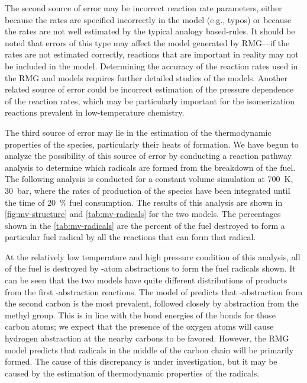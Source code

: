 \documentclass[12pt]{../ussci}
\begin{document}
The second source of error may be incorrect reaction rate parameters, either
because the rates are specified incorrectly in the model (e.g., typos) or
because the rates are not well estimated by the typical analogy based-rules. It
should be noted that errors of this type may affect the model generated by
RMG---if the rates are not estimated correctly, reactions that are important in
reality may not be included in the model. Determining the accuracy of the
reaction rates used in the RMG and \textcite{Dievart2013} models requires
further detailed studies of the models. Another related source of error could be
incorrect estimation of the pressure dependence of the reaction rates, which may
be particularly important for the isomerization reactions prevalent in
low-temperature chemistry.

The third source of error may lie in the estimation of the thermodynamic
properties of the species, particularly their heats of formation. We have begun
to analyze the possibility of this source of error by conducting a reaction
pathway analysis to determine which radicals are formed from the breakdown of
the fuel. The following analysis is conducted for a constant volume simulation
at \SI{700}{\K}, \SI{30}{\bar}, where the rates of production of the species
have been integrated until the time of \SI{20}{\percent} fuel consumption. The
results of this analysis are shown in \cref{fig:mv-structure} and
\cref{tab:mv-radicals} for the two models. The percentages shown in the
\cref{tab:mv-radicals} are the percent of the fuel destroyed to form a
particular fuel radical by all the reactions that can form that radical.

At the relatively low temperature and high pressure condition of this analysis,
all of the fuel is destroyed by -atom abstractions to form the fuel
radicals shown. It can be seen that the two models have quite different
distributions of products from the first -abstraction reactions. The model
of \textcite{Dievart2013} predicts that -abstraction from the second
carbon is the most prevalent, followed closely by abstraction from the methyl
group. This is in line with the bond energies of the  bonds for those
carbon atoms; we expect that the presence of the oxygen atoms will cause
hydrogen abstraction at the nearby carbons to be favored. However, the RMG model
predicts that radicals in the middle of the carbon chain will be primarily
formed. The cause of this discrepancy is under investigation, but it may be
caused by the estimation of thermodynamic properties of the radicals.
\end{document}
